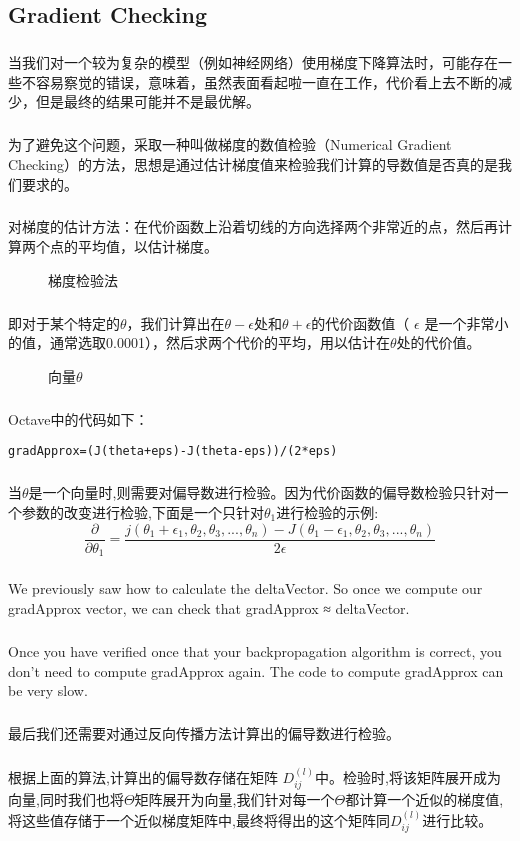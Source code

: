 \documentclass{article}
\begin{document}
\begin{CJK}{UTF8}{gbsn}
\subsection{Gradient Checking}
\subparagraph{}
当我们对一个较为复杂的模型（例如神经网络）使用梯度下降算法时，可能存在一些不容易察觉的错误，意味着，虽然表面看起啦一直在工作，代价看上去不断的减少，但是最终的结果可能并不是最优解。
\subparagraph{}
为了避免这个问题，采取一种叫做梯度的数值检验（Numerical Gradient Checking）的方法，思想是通过估计梯度值来检验我们计算的导数值是否真的是我们要求的。
\subparagraph{}
对梯度的估计方法：在代价函数上沿着切线的方向选择两个非常近的点，然后再计算两个点的平均值，以估计梯度。
\begin{figure}[H]
\caption{梯度检验法}
\label{fig:537}
\end{figure}
\begin{figure}[H]
\label{fig:538}
\end{figure}
\subparagraph{}
即对于某个特定的$\theta$，我们计算出在$\theta-\epsilon$处和$\theta+\epsilon$的代价函数值（ $\epsilon$ 是一个非常小的值，通常选取0.0001），然后求两个代价的平均，用以估计在$\theta$处的代价值。
\begin{figure}[H]
\caption{向量$\theta$}
\label{fig:539}
\end{figure}
\subparagraph{}
Octave中的代码如下：
\begin{verbatim}
gradApprox=(J(theta+eps)-J(theta-eps))/(2*eps)
\end{verbatim}
\subparagraph{}
当$\theta$是一个向量时,则需要对偏导数进行检验。因为代价函数的偏导数检验只针对一个参数的改变进行检验,下面是一个只针对$\theta_1$进行检验的示例:
\begin{equation}
\frac{\partial}{\partial{\theta_1}}=\frac{j(\theta_1+\epsilon_1,\theta_2,\theta_3,...,\theta_n)-J(\theta_1-\epsilon_1,\theta_2,\theta_3,...,\theta_n)}{2\epsilon}
\end{equation}
\subparagraph{}
We previously saw how to calculate the deltaVector. So once we compute our gradApprox vector, we can check that gradApprox ≈ deltaVector. 
\subparagraph{}
Once you have verified once that your backpropagation algorithm is correct, you don't need to compute gradApprox again. The code to compute gradApprox can be very slow.
\begin{figure}[H]
\label{fig:540}
\end{figure}
\subparagraph{}
最后我们还需要对通过反向传播方法计算出的偏导数进行检验。
\subparagraph{}
根据上面的算法,计算出的偏导数存储在矩阵 $D_{ij}^{(l)}$中。检验时,将该矩阵展开成为向量,同时我们也将$\Theta$矩阵展开为向量,我们针对每一个$\Theta$都计算一个近似的梯度值,将这些值存储于一个近似梯度矩阵中,最终将得出的这个矩阵同$D_{ij}^{(l)}$进行比较。
\begin{figure}[H]
\label{fig:540}
\end{figure}
\begin{figure}[H]
\label{fig:541}
\end{figure}

\end{CJK}
\end{document}
